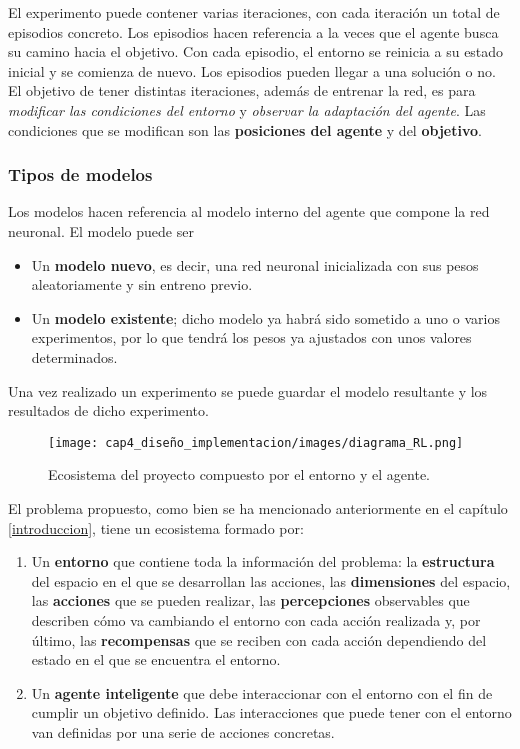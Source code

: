 El experimento puede contener varias iteraciones, con cada iteración un total de episodios concreto. Los episodios hacen referencia a la veces que el agente busca su camino hacia el objetivo. Con cada episodio, el entorno se reinicia a su estado inicial y se comienza de nuevo. Los episodios pueden llegar a una solución o no. \\

El objetivo de tener distintas iteraciones, además de entrenar la red, es para\textit{ modificar las condiciones del entorno} y \textit{observar la adaptación del agente}. Las condiciones que se modifican son las \textbf{posiciones del agente} y del \textbf{objetivo}. 

\subsubsection{Tipos de modelos} \label{tiposModelos}

Los modelos hacen referencia al modelo interno del agente que compone la red neuronal. El modelo puede ser
\begin{itemize}
    \item Un \textbf{modelo nuevo}, es decir, una red neuronal inicializada con sus pesos aleatoriamente y sin entreno previo. 
    \item Un \textbf{modelo existente}; dicho modelo ya habrá sido sometido a uno o varios experimentos, por lo que tendrá los pesos ya ajustados con unos valores determinados. 
\end{itemize}

Una vez realizado un experimento se puede guardar el modelo resultante y los resultados de dicho experimento. 


\begin{figure}[ht!]
    \centering
    \texttt{[image: cap4\_diseño\_implementacion/images/diagrama\_RL.png]}
    \caption{Ecosistema del proyecto compuesto por el entorno y el agente.}
    \label{fig:red_neuronal_simple}
\end{figure}

El problema propuesto, como bien se ha mencionado anteriormente en el capítulo \ref{introduccion}, tiene un ecosistema formado por: 
\begin{enumerate}
    \item Un \textbf{entorno} que contiene toda la información del problema: la \textbf{estructura} del espacio en el que se desarrollan las acciones, las \textbf{dimensiones} del espacio, las \textbf{acciones} que se pueden realizar, las \textbf{percepciones} observables que describen cómo va cambiando el entorno con cada acción realizada y, por último, las \textbf{recompensas} que se reciben con cada acción dependiendo del estado en el que se encuentra el entorno. 
    \item Un \textbf{agente inteligente} que debe interaccionar con el entorno con el fin de cumplir un objetivo definido. Las interacciones que puede tener con el entorno van definidas por una serie de acciones concretas. 
\end{enumerate}

